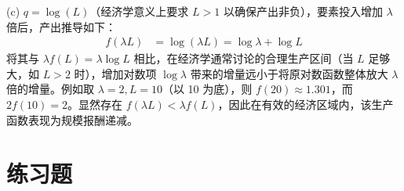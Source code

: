 \begin{enumerate}[label=\textbf{\arabic*.}, leftmargin=*]
		(c) $q=\log(L)$（经济学意义上要求 $L>1$ 以确保产出非负），要素投入增加 $\lambda$ 倍后，产出推导如下：
		\[
		\begin{aligned}
			f(\lambda L) &= \log(\lambda L) = \log\lambda + \log L
		\end{aligned}
		\]
		将其与 $\lambda f(L) = \lambda \log L$ 相比，在经济学通常讨论的合理生产区间（当 $L$ 足够大，如 $L>2$ 时），增加对数项 $\log\lambda$ 带来的增量远小于将原对数函数整体放大 $\lambda$ 倍的增量。例如取 $\lambda=2, L=10$（以 10 为底），则 $f(20) \approx 1.301$，而 $2f(10) = 2$。显然存在 $f(\lambda L) < \lambda f(L)$，因此在有效的经济区域内，该生产函数表现为规模报酬递减。
		
	\end{enumerate}
	\section{练习题}
